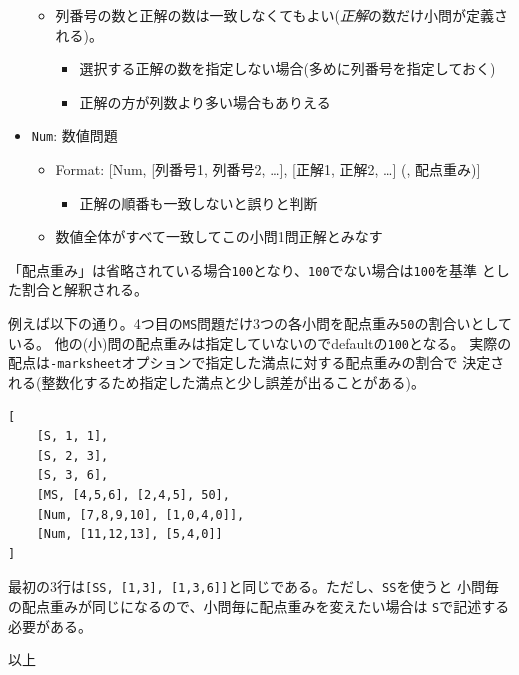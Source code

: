 \begin{itemize}
\begin{itemize}
\begin{itemize}
\end{itemize}

\item 列番号の数と正解の数は一致しなくてもよい(\emph{正解}の数だけ小問が定義される)。

\begin{itemize}
\item 選択する正解の数を指定しない場合(多めに列番号を指定しておく)

\item 正解の方が列数より多い場合もありえる

\end{itemize}

\end{itemize}

\item \texttt{Num}: 数値問題

\begin{itemize}
\item Format: {[Num, {[列番号1, 列番号2, {\ldots}]}, {[正解1, 正解2, {\ldots}]} (, 配点重み)]}

\begin{itemize}
\item 正解の順番も一致しないと誤りと判断

\end{itemize}

\item 数値全体がすべて一致してこの小問1問正解とみなす

\end{itemize}

\end{itemize}
「配点重み」は省略されている場合\texttt{100}となり、\texttt{100}でない場合は\texttt{100}を基準
とした割合と解釈される。

例えば以下の通り。4つ目の\texttt{MS}問題だけ3つの各小問を配点重み\texttt{50}の割合いとしている。
他の(小)問の配点重みは指定していないのでdefaultの\texttt{100}となる。
実際の配点は\texttt{-marksheet}オプションで指定した満点に対する配点重みの割合で
決定される(整数化するため指定した満点と少し誤差が出ることがある)。
\begin{tcolorbox}[enhanced jigsaw,breakable,colframe=\mycolor ,colback=white,colbacktitle=\mycolor ,coltitle=white,fonttitle=\bfseries\sffamily,title=正解定義ファイルの例]

\begin{verbatim}
[
    [S, 1, 1],
    [S, 2, 3],
    [S, 3, 6],
    [MS, [4,5,6], [2,4,5], 50],
    [Num, [7,8,9,10], [1,0,4,0]],
    [Num, [11,12,13], [5,4,0]]
]
\end{verbatim}

\end{tcolorbox}
最初の3行は\texttt{[SS, [1,3], [1,3,6]]}と同じである。ただし、\texttt{SS}を使うと
小問毎の配点重みが同じになるので、小問毎に配点重みを変えたい場合は
\texttt{S}で記述する必要がある。

\hfill  以上


